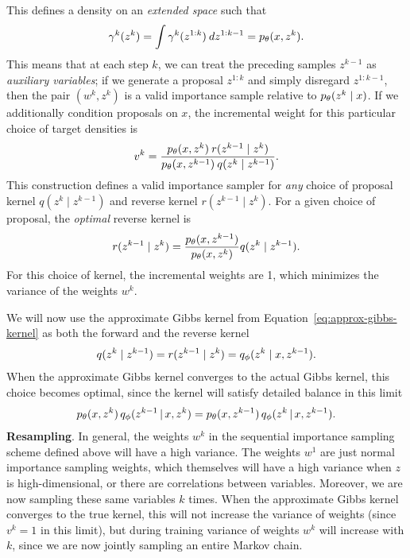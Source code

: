 \documentclass{article}
\theoremstyle{definition}
\begin{document}
This defines a density on an \emph{extended space} such that 
\begin{align*}
    \gamma^k(z^k) = \int \gamma^k(z^{1:k}) \: dz^{1:k-1} = p_\theta(x, z^k).
\end{align*}
This means that at each step $k$, we can treat the preceding samples $z^{k-1}$ as \emph{auxiliary variables}; if we generate a proposal $z^{1:k}$ and simply disregard $z^{1:k-1}$, then the pair $(w^k, z^k)$ is a valid importance sample relative to $p_\theta(z^k \mid x)$. If we additionally condition proposals on $x$, the incremental weight for this particular choice of target densities is
\begin{align}
    \label{eq:incremental-weight-forward-reverse}
    v^k 
    = 
    \frac{p_\theta(x,z^k) \: r(z^{k-1} \mid  z^k)}
         {p_\theta(x,z^{k-1}) \: q(z^{k} \mid  z^{k-1})}
    .
\end{align}
This construction defines a valid importance sampler for \emph{any} choice of proposal kernel $q(z^k \mid z^{k-1})$ and reverse kernel $r(z^{k-1} \mid z^{k})$. For a given choice of proposal, the \emph{optimal} reverse kernel is
\begin{align*}
    r(z^{k-1} \mid  z^k)
    =   
    \frac{p_\theta(x,z^{k-1})}
         {p_\theta(x,z^k)}
    q(z^{k} \mid  z^{k-1})
    .
\end{align*}
For this choice of kernel, the incremental weights are 1, which minimizes the variance of the weights $w^k$.

We will now use the approximate Gibbs kernel from Equation~\ref{eq:approx-gibbs-kernel} as both the forward and the reverse kernel
\begin{align}
    q(z^{k} \mid  z^{k-1}) = r(z^{k-1} \mid  z^k) = q_\phi(z^k \mid x, z^{k-1}).
\end{align}
When the approximate Gibbs kernel converges to the actual Gibbs kernel, this choice becomes optimal, since the kernel will satisfy detailed balance in this limit
\begin{align*}
    p_\theta(x, z^k) 
    \,
    q_\phi(z^{k-1} \,|\, x, z^{k})
    =
    p_\theta(x, z^{k-1}) 
    \,
    q_\phi(z^{k} \,|\, x, z^{k-1}).
\end{align*}
\textbf{Resampling}. In general, the weights $w^k$ in the sequential importance sampling scheme defined above will have a high variance. The weights $w^1$ are just normal importance sampling weights, which themselves will have a high variance when $z$ is high-dimensional, or there are correlations between variables. Moreover, we are now sampling these same variables $k$ times. When the approximate Gibbs kernel converges to the true kernel, this will not increase the variance of weights (since $v^k=1$ in this limit), but during training variance of weights $w^k$ will increase with $k$, since we are now jointly sampling an entire Markov chain.
\end{document}
